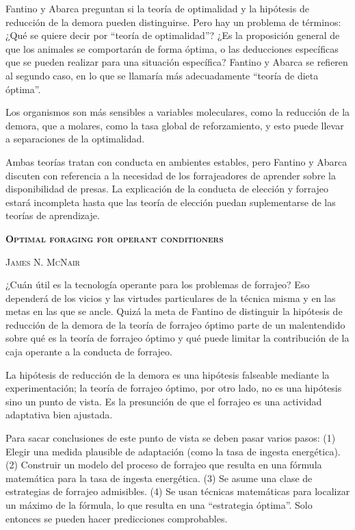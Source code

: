 \documentclass[a4paper,12pt]{article}
\begin{document}
Fantino y Abarca preguntan si la teoría de optimalidad y la hipótesis de reducción de la demora pueden distinguirse. Pero hay un problema de términos: ¿Qué se quiere decir por ``teoría de optimalidad''? ¿Es la proposición general de que los animales se comportarán de forma óptima, o las deducciones específicas que se pueden realizar para una situación específica? Fantino y Abarca se refieren al segundo caso, en lo que se llamaría más adecuadamente ``teoría de dieta óptima''.

Los organismos son más sensibles a variables moleculares, como la reducción de la demora, que a molares, como la tasa global de reforzamiento, y esto puede llevar a separaciones de la optimalidad. 

Ambas teorías tratan con conducta en ambientes estables, pero Fantino y Abarca discuten con referencia a la necesidad de los forrajeadores de aprender sobre la disponibilidad de presas. La explicación de la conducta de elección y forrajeo estará incompleta hasta que las teoría de elección puedan suplementarse de las teorías de aprendizaje.

{\scshape\bfseries Optimal foraging for operant conditioners}

{\scshape James N. McNair}

¿Cuán útil es la tecnología operante para los problemas de forrajeo? Eso dependerá de los vicios y las virtudes particulares de la técnica misma y en las metas en las que se ancle. Quizá la meta de Fantino de distinguir la hipótesis de reducción de la demora de la teoría de forrajeo óptimo parte de un malentendido sobre qué es la teoría de forrajeo óptimo y qué puede limitar la contribución de la caja operante a la conducta de forrajeo.

La hipótesis de reducción de la demora es una hipótesis falseable mediante la experimentación; la teoría de forrajeo óptimo, por otro lado, no es una hipótesis sino un punto de vista. Es la presunción de que el forrajeo es una actividad adaptativa bien ajustada.

Para sacar conclusiones de este punto de vista se deben pasar varios pasos: (1) Elegir una medida plausible de adaptación (como la tasa de ingesta energética). (2) Construir un modelo del proceso de forrajeo que resulta en una fórmula matemática para la tasa de ingesta energética. (3) Se asume una clase de estrategias de forrajeo admisibles. (4) Se usan técnicas matemáticas para localizar un máximo de la fórmula, lo que resulta en una ``estrategia óptima''. Solo entonces se pueden hacer predicciones comprobables.
\end{document}
